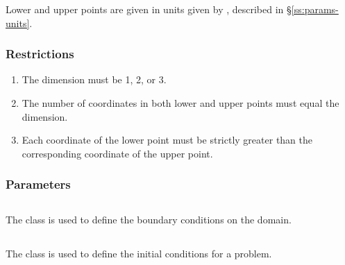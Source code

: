 Lower and upper points are given in units given by ,
described in \S\ref{ss:params-units}.

\subsubsection{Restrictions}

\begin{enumerate}
\item The dimension must be 1, 2, or 3.
\item The number of coordinates in both lower and upper points must equal the dimension.
\item Each coordinate of the lower point must be strictly greater than the corresponding coordinate of the upper point.
\end{enumerate}


\subsubsection{Parameters}

\subsection{} \label{ss:component-boundary}

The  class is used to define the boundary conditions on
the domain.

\subsection{} \label{s:component-initial}

The  class is used to define the initial conditions for
a problem.



